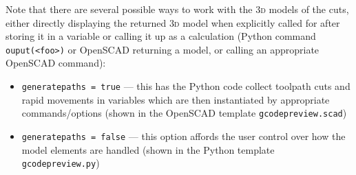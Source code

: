 \documentclass{ltxdoc}
\begin{document}
%
%
%
%
%
%

%
%

Note that there are several possible ways to work with the \textsc{3d} models of the cuts, either directly displaying the returned \textsc{3d} model when explicitly called for after storing it in a variable or calling it up as a calculation (Python command \verb|ouput(<foo>)| or OpenSCAD returning a model, or calling an appropriate OpenSCAD command):

\begin{itemize}
\item \verb|generatepaths = true| --- this has the Python code collect toolpath cuts and rapid movements in variables which are then instantiated by appropriate commands/options (shown in the OpenSCAD template \verb|gcodepreview.scad|)
\item \verb|generatepaths = false| --- this option affords the user control over how the model elements are handled (shown in the Python template \verb|gcodepreview.py|)
\end{itemize}
\end{document}
